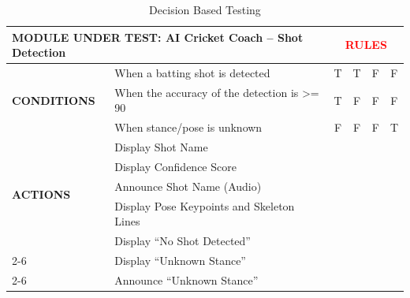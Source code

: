 \begin{table}[H]
	\centering
	\caption{Decision Based Testing}
	\renewcommand{\arraystretch}{0.9}
	\begin{tabular}{|l|l|c|c|c|c|}
		\hline
		\multicolumn{2}{|l|}{\textbf{MODULE UNDER TEST: AI Cricket Coach – Shot Detection}} & 
		\multicolumn{4}{c|}{\textcolor{red}{\textbf{RULES}}} \\ \hline
		
		\multirow{3}{*}{\textbf{CONDITIONS}}
		& When a batting shot is detected 
		& \cellcolor{green!60!black}T & \cellcolor{green!60!black}T & \cellcolor{red!90}F & \cellcolor{red!90}F \\ \cline{2-6}
		
		& When the accuracy of the detection is >= 90 
		& \cellcolor{green!60!black}T & \cellcolor{red!90}F & \cellcolor{red!90}F & \cellcolor{red!90}F \\ \cline{2-6}
		
		& When stance/pose is unknown 
		& \cellcolor{red!90}F & \cellcolor{red!90}F & \cellcolor{red!90}F & \cellcolor{green!60!black}T \\ \hline
		
		\multirow{5}{*}{\textbf{ACTIONS}}
		& Display Shot Name 
		& {\color{green!60!black}\checkmark} &  &  &  \\ \cline{2-6}
		
		& Display Confidence Score 
		& {\color{green!60!black}\checkmark} & {\color{green!60!black}\checkmark} &  &  \\ \cline{2-6}
		
		& Announce Shot Name (Audio) 
		& {\color{green!60!black}\checkmark} &  &  &  \\ \cline{2-6}
		
		& Display Pose Keypoints and Skeleton Lines
		& {\color{green!60!black}\checkmark} & {\color{green!60!black}\checkmark} &  &  \\ \cline{2-6}
			
		& Display ``No Shot Detected'' 
		&  &  & {\color{green!60!black}\checkmark} &  \\ \cline{2-6}
		
		& Display ``Unknown Stance'' 
		&  &  &  & {\color{green!60!black}\checkmark} \\ \cline{2-6}
		
		& Announce ``Unknown Stance'' 
		&  &  &  & {\color{green!60!black}\checkmark} \\ \hline
		
	\end{tabular}
\end{table}

